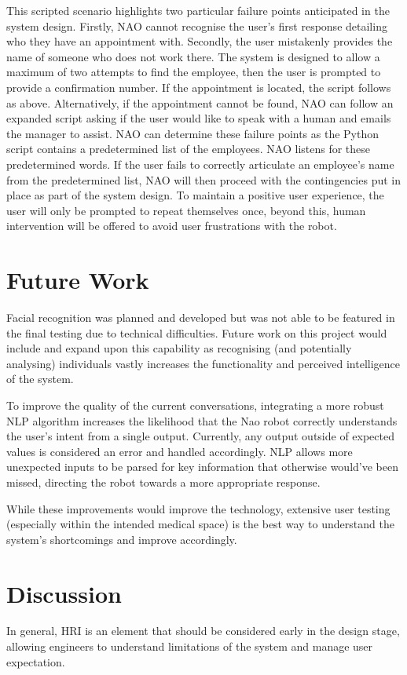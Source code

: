 \documentclass[conference]{IEEEtran}
\begin{document}
This scripted scenario highlights two particular failure points anticipated in the system design. Firstly, NAO cannot recognise the user’s first response detailing who they have an appointment with. Secondly, the user mistakenly provides the name of someone who does not work there.  The system is designed to allow a maximum of two attempts to find the employee, then the user is prompted to provide a confirmation number. If the appointment is located, the script follows as above. Alternatively, if the appointment cannot be found, NAO can follow an expanded script asking if the user would like to speak with a human and emails the manager to assist. NAO can determine these failure points as the Python script contains a predetermined list of the employees. NAO listens for these predetermined words. If the user fails to correctly articulate an employee’s name from the predetermined list, NAO will then proceed with the contingencies put in place as part of the system design. To maintain a positive user experience, the user will only be prompted to repeat themselves once, beyond this, human intervention will be offered to avoid user frustrations with the robot. 


\section{Future Work}Facial recognition was planned and developed but was not able to be featured in the final testing due to 
technical difficulties. Future work on this project would include and expand upon this capability as recognising (and potentially 
analysing) individuals vastly increases the functionality and perceived intelligence of the system.

To improve the quality of the current conversations, integrating a more robust NLP algorithm increases the likelihood that the Nao 
robot correctly understands the user’s intent from a single output. Currently, any output outside of expected values is considered 
an error and handled accordingly. NLP allows more unexpected inputs to be parsed for key information that otherwise would’ve been 
missed, directing the robot towards a more appropriate response.

While these improvements would improve the technology, extensive user testing (especially within the intended medical space) is the 
best way to understand the system's shortcomings and improve accordingly.


\section{Discussion}
In general, HRI is an element that should be considered early in the design stage, allowing engineers to understand limitations of the system and manage user expectation.
\end{document}
